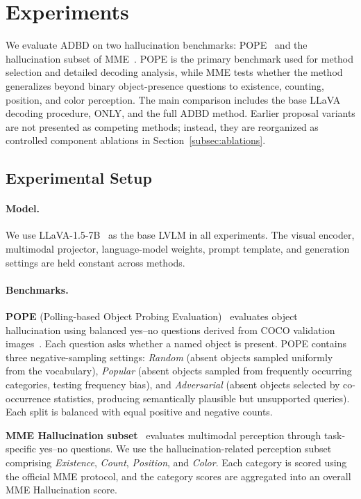 \section{Experiments}
\label{sec:experiments}

We evaluate ADBD on two hallucination benchmarks: POPE~\cite{li2023pope} and the hallucination subset of MME~\cite{fu2023mme}. POPE is the primary benchmark used for method selection and detailed decoding analysis, while MME tests whether the method generalizes beyond binary object-presence questions to existence, counting, position, and color perception. The main comparison includes the base LLaVA decoding procedure, ONLY, and the full ADBD method. Earlier proposal variants are not presented as competing methods; instead, they are reorganized as controlled component ablations in Section~\ref{subsec:ablations}.

\subsection{Experimental Setup}

\paragraph{Model.}
We use LLaVA-1.5-7B~\cite{liu2024visual} as the base LVLM in all experiments. The visual encoder, multimodal projector, language-model weights, prompt template, and generation settings are held constant across methods.

\paragraph{Benchmarks.}
\textbf{POPE} (Polling-based Object Probing Evaluation)~\cite{li2023pope} evaluates object hallucination using balanced yes--no questions derived from COCO validation images~\cite{lin2014microsoft}. Each question asks whether a named object is present. POPE contains three negative-sampling settings: \emph{Random} (absent objects sampled uniformly from the vocabulary), \emph{Popular} (absent objects sampled from frequently occurring categories, testing frequency bias), and \emph{Adversarial} (absent objects selected by co-occurrence statistics, producing semantically plausible but unsupported queries). Each split is balanced with equal positive and negative counts.

\textbf{MME Hallucination subset}~\cite{fu2023mme} evaluates multimodal perception through task-specific yes--no questions. We use the hallucination-related perception subset comprising \emph{Existence}, \emph{Count}, \emph{Position}, and \emph{Color}. Each category is scored using the official MME protocol, and the category scores are aggregated into an overall MME Hallucination score.


